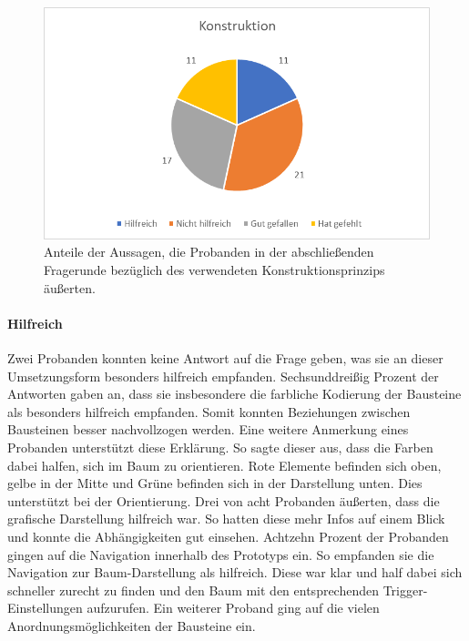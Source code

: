 \begin{figure}[h]
\centering
\includegraphics[width=1\textwidth]{pictures/diagramme/aussagenkonstr}
\caption{Anteile der Aussagen, die Probanden in der abschließenden Fragerunde bezüglich des verwendeten Konstruktionsprinzips äußerten.}
\label{aussagensichtb}
\end{figure}


\paragraph{Hilfreich}Zwei Probanden konnten keine Antwort auf die Frage geben, was sie an dieser Umsetzungsform besonders hilfreich empfanden. Sechsunddreißig Prozent der Antworten gaben an, dass sie insbesondere die farbliche Kodierung der Bausteine als besonders hilfreich empfanden. Somit konnten Beziehungen zwischen Bausteinen besser nachvollzogen werden. Eine weitere Anmerkung eines Probanden unterstützt diese Erklärung. So sagte dieser aus, dass die Farben dabei halfen, sich im Baum zu orientieren. Rote Elemente befinden sich oben, gelbe in der Mitte und Grüne befinden sich in der Darstellung unten. Dies unterstützt bei der Orientierung. Drei von acht Probanden äußerten, dass die grafische Darstellung hilfreich war. So hatten diese mehr Infos auf einem Blick und konnte die Abhängigkeiten gut einsehen. Achtzehn Prozent der Probanden gingen auf die Navigation innerhalb des Prototyps ein. So empfanden sie die Navigation zur Baum-Darstellung als hilfreich. Diese war klar und half dabei sich schneller zurecht zu finden und den Baum mit den entsprechenden Trigger-Einstellungen aufzurufen. Ein weiterer Proband ging auf die vielen Anordnungsmöglichkeiten der Bausteine ein. 


